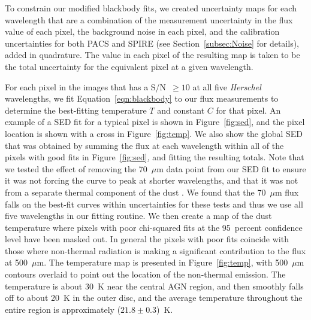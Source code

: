 To constrain our modified blackbody fits, we created uncertainty maps for each wavelength that are a combination of the measurement uncertainty in the flux value of each pixel, the background noise in each pixel, and the calibration uncertainties for both PACS and SPIRE (see Section~\ref{subsec:Noise} for details), added in quadrature.  The value in each pixel of the resulting map is taken to be the total uncertainty for the equivalent pixel at a given wavelength.

For each pixel in the images that has a S/N~$\ge 10$ at all five \emph{Herschel} wavelengths, we fit Equation~\ref{eqn:blackbody} to our flux measurements to determine the best-fitting temperature $T$ and constant $C$ for that pixel.  An example of a SED fit for a typical pixel is shown in Figure~\ref{fig:sed}, and the pixel location is shown with a cross in Figure~\ref{fig:temp}.  We also show the global SED that was obtained by summing the flux at each wavelength within all of the pixels with good fits in Figure~\ref{fig:sed}, and fitting the resulting totals.  Note that we tested the effect of removing the 70~$\mu$m data point from our SED fit to ensure it was not forcing the curve to peak at shorter wavelengths, and that it was not from a separate thermal component of the dust \citep{2010A&A...518L..51S, 2010A&A...518L..65B, Bendo_2011_submit}.  We found that the 70~$\mu$m flux falls on the best-fit curves within uncertainties for these tests and thus we use all five wavelengths in our fitting routine.  We then create a map of the dust temperature where pixels with poor chi-squared fits at the 95~percent confidence level have been masked out.  In general the pixels with poor fits coincide with those where non-thermal radiation is making a significant contribution to the flux at 500~$\mu$m. The temperature map is presented in Figure~\ref{fig:temp}, with 500~$\mu$m contours overlaid to point out the location of the non-thermal emission.  The temperature is about 30~K near the central AGN region, and then smoothly falls off to about 20~K in the outer disc, and the average temperature throughout the entire region is approximately ($21.8 \pm 0.3$)~K.
